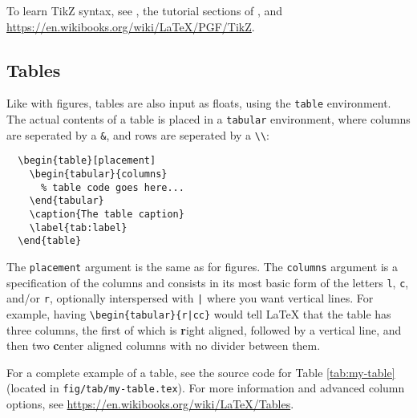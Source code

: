 

To learn TikZ syntax, see \citep{minimaltikz}, the tutorial sections of \citep{tikzmanual}, and \url{https://en.wikibooks.org/wiki/LaTeX/PGF/TikZ}.


\subsection{Tables}
\label{sec:tables}

Like with figures, tables are also input as floats, using the \texttt{table} environment.
The actual contents of a table is placed in a \texttt{tabular} environment, where columns are seperated by a \verb!&!, and rows are seperated by a \verb!\\!:

\begin{verbatim}
  \begin{table}[placement]
    \begin{tabular}{columns}
      % table code goes here...
    \end{tabular}
    \caption{The table caption}
    \label{tab:label}
  \end{table}
\end{verbatim}

The \texttt{placement} argument is the same as for figures.
The \texttt{columns} argument is a specification of the columns and consists in its most basic form of the letters \texttt{l}, \texttt{c}, and/or \texttt{r}, optionally interspersed with \verb!|! where you want vertical lines.
For example, having \verb!\begin{tabular}{r|cc}! would tell \LaTeX{} that the table has three columns, the first of which is \textbf{r}ight aligned, followed by a vertical line, and then two \textbf{c}enter aligned columns with no divider between them.

For a complete example of a table, see the source code for Table \ref{tab:my-table} (located in \verb!fig/tab/my-table.tex!).
For more information and advanced column options, see \url{https://en.wikibooks.org/wiki/LaTeX/Tables}.
